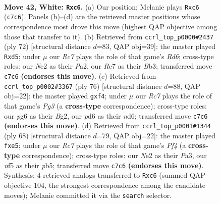 \documentclass[11pt]{article}
\begin{document}
\clearpage

\begin{figure}[p]\centering
\begin{subfigure}{0.46\textwidth}\centering
\resizebox{\linewidth}{!}{%
\newchessgame
\chessboard[
  setfen={1r6/2R5/p1qp1kp1/4rn1p/1p5P/4p3/4NPP1/R4K2 w - - 0 42},
  showmover=false,
  pgfstyle=straightmove, color=movearrow, markmove={c7-c6}
]}
\caption{}
\end{subfigure}\hfill
\begin{subfigure}{0.46\textwidth}\centering
\resizebox{\linewidth}{!}{%
\newchessgame
\chessboard[
  setfen={8/p3r1kp/1p1R2n1/3qp3/5p2/1BP3P1/PP5P/5K2 w - - 0 37},
  showmover=false,
  pgfstyle=straightmove, color=movearrow, markmove={d6-d5}
]}
\caption{}
\end{subfigure}
\\[4pt]
\begin{subfigure}{0.46\textwidth}\centering
\resizebox{\linewidth}{!}{%
\newchessgame
\chessboard[
  setfen={2r5/p4pk1/R2n2p1/3P4/4pq2/6P1/1P3PB1/6K1 w - - 0 39},
  showmover=false,
  pgfstyle=straightmove, color=movearrow, markmove={g3-f4}
]}
\caption{}
\end{subfigure}\hfill
\begin{subfigure}{0.46\textwidth}\centering
\resizebox{\linewidth}{!}{%
\newchessgame
\chessboard[
  setfen={3r1n2/6k1/p3pnp1/1pN1q2p/5P1P/P7/KP3PB1/2R5 w - - 0 35},
  showmover=false,
  pgfstyle=straightmove, color=movearrow, markmove={f4-e5}
]}
\caption{}
\end{subfigure}
\caption{\textbf{Move 42, White: \texttt{Rxc6}.} (a) Our position; Melanie plays \texttt{Rxc6} (\texttt{c7c6}). Panels (b)--(d) are the retrieved master positions whose correspondence most drove this move (highest QAP objective among those that transfer to it). (b) Retrieved from \texttt{ccrl\_top\_p0000\#2437} (ply 72) [structural distance $d$=83, QAP obj=39]: the master played \texttt{Rxd5}; under $\mu$ our \emph{Rc7} plays the role of that game's \emph{Rd6}; cross-type roles: our \emph{N}e2 as their \emph{P}a2, our \emph{R}c7 as their \emph{B}b3; transferred move \texttt{c7c6} \textbf{(endorses this move)}. (c) Retrieved from \texttt{ccrl\_top\_p0002\#3367} (ply 76) [structural distance $d$=88, QAP obj=22]: the master played \texttt{gxf4}; under $\mu$ our \emph{Rc7} plays the role of that game's \emph{Pg3} (a \textbf{cross-type} correspondence); cross-type roles: our \emph{p}g6 as their \emph{B}g2, our \emph{p}d6 as their \emph{n}d6; transferred move \texttt{c7c6} \textbf{(endorses this move)}. (d) Retrieved from \texttt{ccrl\_top\_p0001\#1344} (ply 68) [structural distance $d$=79, QAP obj=22]: the master played \texttt{fxe5}; under $\mu$ our \emph{Rc7} plays the role of that game's \emph{Pf4} (a \textbf{cross-type} correspondence); cross-type roles: our \emph{N}e2 as their \emph{P}a3, our \emph{n}f5 as their \emph{p}b5; transferred move \texttt{c7c6} \textbf{(endorses this move)}. Synthesis: 4 retrieved analogs transferred to \texttt{Rxc6} (summed QAP objective 104, the strongest correspondence among the candidate moves); Melanie committed it via the \texttt{search} selector.}
\label{fig:thought-m82}
\end{figure}
\end{document}
